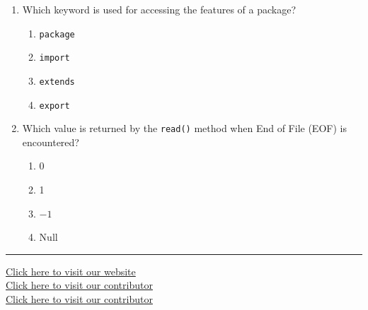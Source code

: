 \documentclass[11pt,a4paper]{article}
\begin{document}
\begin{enumerate}[label=(\roman*),leftmargin=*,itemsep=8pt]
\begin{enumerate}[label=(\alph*),itemsep=2pt]
    \item Stack
    \item String memory
    \item Heap memory
    \item Random storage space
  \end{enumerate}

  \item Which keyword is used for accessing the features of a package?
  
\begin{enumerate}[label=(\alph*),itemsep=2pt]
    \item   \texttt{package}
    \item   \texttt{import}
    \item   \texttt{extends}
    \item   \texttt{export}
  \end{enumerate}

  \item Which value is returned by the   \texttt{read()} method when End of File (EOF) is encountered?
  
\begin{enumerate}[label=(\alph*),itemsep=2pt]
    \item 0
    \item 1
    \item $-1$
    \item Null
  \end{enumerate}

\end{enumerate}

\vfill
\rule{\linewidth}{0.4pt}

\begin{center}\small
\href{https://bhu-exam.vercel.app/}{Click here to visit our website}\\[4pt]\href{https://me-aryan.vercel.app/}{Click here to visit our contributor}\\[4pt]\href{https://quashan-me.vercel.app/}{Click here to visit our contributor}
\end{center}
\end{document}
